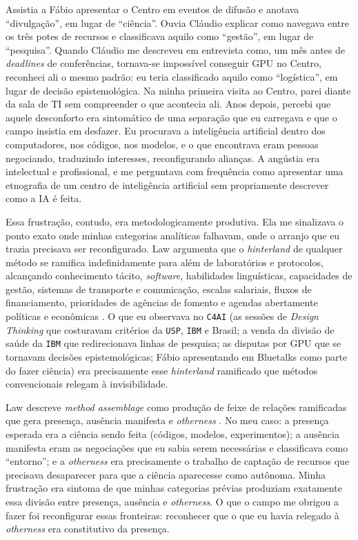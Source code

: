 Assistia a Fábio apresentar o Centro em eventos de difusão e anotava \enquote{divulgação}, em lugar de \enquote{ciência}. Ouvia Cláudio explicar como navegava entre os três potes de recursos e classificava aquilo como \enquote{gestão}, em lugar de \enquote{pesquisa}. Quando Cláudio me descreveu em entrevista como, um mês antes de \textit{deadlines} de conferências, tornava-se impossível conseguir GPU no Centro, reconheci ali o mesmo padrão: eu teria classificado aquilo como \enquote{logística}, em lugar de decisão epistemológica. Na minha primeira visita ao Centro, parei diante da sala de TI sem compreender o que acontecia ali. Anos depois, percebi que aquele desconforto era sintomático de uma separação que eu carregava e que o campo insistia em desfazer. Eu procurava a inteligência artificial dentro dos computadores, nos códigos, nos modelos, e o que encontrava eram pessoas negociando, traduzindo interesses, reconfigurando alianças. A angústia era intelectual e profissional, e me perguntava com frequência como apresentar uma etnografia de um centro de inteligência artificial sem propriamente descrever como a IA é feita.

Essa frustração, contudo, era metodologicamente produtiva. Ela me sinalizava o ponto exato onde minhas categorias analíticas falhavam, onde o arranjo que eu trazia precisava ser reconfigurado. Law argumenta que o \textit{hinterland} de qualquer método se ramifica indefinidamente para além de laboratórios e protocolos, alcançando conhecimento tácito, \textit{software}, habilidades linguísticas, capacidades de gestão, sistemas de transporte e comunicação, escalas salariais, fluxos de financiamento, prioridades de agências de fomento e agendas abertamente políticas e econômicas \parencite[pp.~41--42]{Law2004After}. O que eu observava no \texttt{C4AI} (as sessões de \textit{Design Thinking} que costuravam critérios da \texttt{USP}, \texttt{IBM} e Brasil; a venda da divisão de saúde da \texttt{IBM} que redirecionava linhas de pesquisa; as disputas por GPU que se tornavam decisões epistemológicas; Fábio apresentando em Bluetalks como parte do fazer ciência) era precisamente esse \textit{hinterland} ramificado que métodos convencionais relegam à invisibilidade.

Law descreve \textit{method assemblage} como produção de feixe de relações ramificadas que gera presença, ausência manifesta e \textit{otherness} \parencite[p.~84]{Law2004After}. No meu caso: a presença esperada era a ciência sendo feita (códigos, modelos, experimentos); a ausência manifesta eram as negociações que eu sabia serem necessárias e classificava como \enquote{entorno}; e a \textit{otherness} era precisamente o trabalho de captação de recursos que precisava desaparecer para que a ciência aparecesse como autônoma. Minha frustração era sintoma de que minhas categorias prévias produziam exatamente essa divisão entre presença, ausência e \textit{otherness}. O que o campo me obrigou a fazer foi reconfigurar essas fronteiras: reconhecer que o que eu havia relegado à \textit{otherness} era constitutivo da presença.

